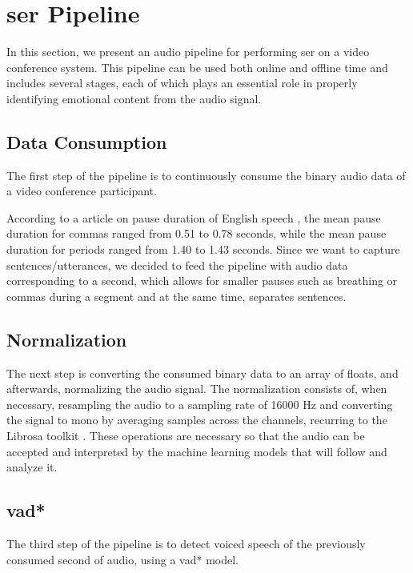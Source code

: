 \chapter{\acl{ser} Pipeline}
\label{chapter:ser_conf}

In this section, we present an audio pipeline for performing \ac{ser} on a video conference system. This pipeline can be used both online and offline time and includes several stages, each of which plays an essential role in properly identifying emotional content from the audio signal.

\section{Data Consumption}

The first step of the pipeline is to continuously consume the binary audio data of a video conference participant.

According to a \citeyear{Liu2022} article on pause duration of English speech \cite{Liu2022}, the mean pause duration for commas ranged from 0.51 to 0.78 seconds, while the mean pause duration for periods ranged from 1.40 to 1.43 seconds. Since we want to capture sentences/utterances, we decided to feed the pipeline with audio data corresponding to a second, which allows for smaller pauses such as breathing or commas during a segment and at the same time, separates sentences.

\section{Normalization}

The next step is converting the consumed binary data to an array of floats, and afterwards, normalizing the audio signal. The normalization consists of, when necessary, resampling the audio to a sampling rate of 16000 Hz and converting the signal to mono by averaging samples across the channels, recurring to the Librosa toolkit \cite{Librosa}. These operations are necessary so that the audio can be accepted and interpreted by the machine learning models that will follow and analyze it.

\section{\acl{vad*}}

The third step of the pipeline is to detect voiced speech of the previously consumed second of audio, using a \ac{vad*} model.

